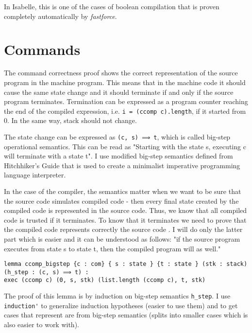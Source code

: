 In Isabelle, this is one of the cases of boolean compilation that is proven completely automatically by \emph{fastforce}.

\section{Commands}
The command correctness proof shows the correct representation of the source program in the machine program. This means that in the machine code it should cause the same state change and it should terminate if and only if the source program terminates. Termination can be expressed as a program counter reaching the end of the compiled expression, i.e. \lstinline{i = (ccomp c).length}, if it started from 0. In the same way, stack should not change.

The state change can be expressed as \lstinline{(c, s) ⟹ t}, which is called big-step operational semantics. This can be read as "Starting with the state s, executing c will terminate with a state t". I use modified big-step semantics defined from Hitchhiker's Guide \cite{hithchiker} that is used to create a minimalist imperative programming language interpreter. 

In the case of the compiler, the semantics matter when we want to be sure that the source code simulates compiled code - then every final state created by the compiled code is represented in the source code. Thus, we know that all compiled code is trusted if it terminates. To know that it terminates we need to prove that the compiled code represents correctly the source code \cite{isabelle}. I will do only the latter part which is easier  and it can be understood as follows: "if the source program executes from state s to state t, then the compiled program will as well." 

\begin{lstlisting}
lemma ccomp_bigstep {c : com} { s : state } {t : state } (stk : stack) 
(h_step : (c, s) ⟹ t) :
exec (ccomp c) (0, s, stk) (list.length (ccomp c), t, stk)
\end{lstlisting}

The proof of this lemma is by induction on big-step semantics \lstinline{h_step}. I use \lstinline{induction'} to generalize induction hypotheses (easier to use them) and to get cases that represent are from big-step semantics (splits into smaller cases which is also easier to work with).

